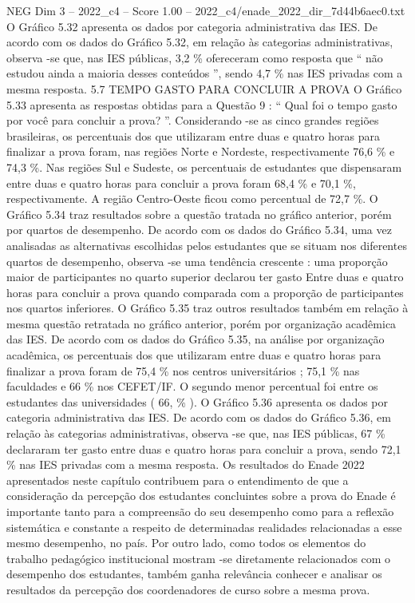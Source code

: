 \begin{textsample}{NEG Dim 3 – 2022\_c4 – Score 1.00 – 2022\_c4/enade\_2022\_dir\_7d44b6aec0.txt}
O Gráfico 5.32 apresenta os dados por categoria administrativa das IES.
De acordo com os dados do Gráfico 5.32, em relação às categorias administrativas, observa -se que, nas IES públicas, 3,2 \% ofereceram como resposta que “ não estudou ainda a maioria desses conteúdos ”, sendo 4,7 \% nas IES privadas com a mesma resposta. 5.7 TEMPO GASTO PARA CONCLUIR A PROVA O Gráfico 5.33 apresenta as respostas obtidas para a Questão 9 : “ Qual foi o tempo gasto por você para concluir a prova? ”.
Considerando -se as cinco grandes regiões brasileiras, os percentuais dos que utilizaram entre duas e quatro horas para finalizar a prova foram, nas regiões Norte e Nordeste, respectivamente 76,6 \% e 74,3 \%.
Nas regiões Sul e Sudeste, os percentuais de estudantes que dispensaram entre duas e quatro horas para concluir a prova foram 68,4 \% e 70,1 \%, respectivamente.
A região Centro-Oeste ficou como percentual de 72,7 \%.
O Gráfico 5.34 traz resultados sobre a questão tratada no gráfico anterior, porém por quartos de desempenho.
De acordo com os dados do Gráfico 5.34, uma vez analisadas as alternativas escolhidas pelos estudantes que se situam nos diferentes quartos de desempenho, observa -se uma tendência crescente : uma proporção maior de participantes no quarto superior declarou ter gasto Entre duas e quatro horas para concluir a prova quando comparada com a proporção de participantes nos quartos inferiores.
O Gráfico 5.35 traz outros resultados também em relação à mesma questão retratada no gráfico anterior, porém por organização acadêmica das IES.
De acordo com os dados do Gráfico 5.35, na análise por organização acadêmica, os percentuais dos que utilizaram entre duas e quatro horas para finalizar a prova foram de 75,4 \% nos centros universitários ; 75,1 \% nas faculdades e 66 \% nos CEFET/IF.
O segundo menor percentual foi entre os estudantes das universidades ( 66, \% ).
O Gráfico 5.36 apresenta os dados por categoria administrativa das IES.
De acordo com os dados do Gráfico 5.36, em relação às categorias administrativas, observa -se que, nas IES públicas, 67 \% declararam ter gasto entre duas e quatro horas para concluir a prova, sendo 72,1 \% nas IES privadas com a mesma resposta.
Os resultados do Enade 2022 apresentados neste capítulo contribuem para o entendimento de que a consideração da percepção dos estudantes concluintes sobre a prova do Enade é importante tanto para a compreensão do seu desempenho como para a reflexão sistemática e constante a respeito de determinadas realidades relacionadas a esse mesmo desempenho, no país.
Por outro lado, como todos os elementos do trabalho pedagógico institucional mostram -se diretamente relacionados com o desempenho dos estudantes, também ganha relevância conhecer e analisar os resultados da percepção dos coordenadores de curso sobre a mesma prova.

\end{textsample}

